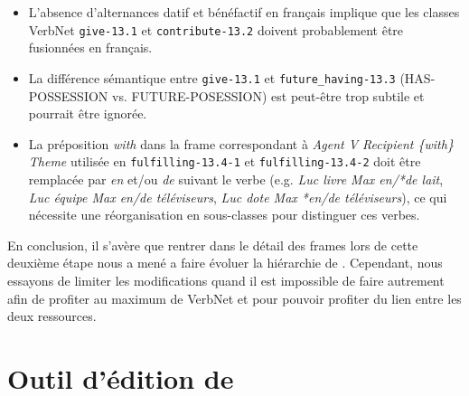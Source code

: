 \begin{itemize}
    \item L'absence d'alternances datif et bénéfactif en français implique que
        les classes VerbNet {\color{blue}\texttt{give-13.1}} et
        {\color{blue}\texttt{contribute-13.2}} doivent probablement être fusionnées en
        français.
    \item La différence sémantique entre {\color{blue}\texttt{give-13.1}} et
        {\color{blue}\texttt{future\_having-13.3}} (HAS-POSSESSION vs. FUTURE-POSESSION)
        est peut-être trop subtile et pourrait être ignorée.
    \item La préposition \textit{with} dans la frame correspondant à \textit{Agent
        V Recipient \{with\} Theme} utilisée en
        {\color{blue}\texttt{fulfilling-13.4-1}} et
        {\color{blue}\texttt{fulfilling-13.4-2}} doit être remplacée par
        \textit{en} et/ou \textit{de} suivant le verbe (e.g. \textit{Luc livre Max
        en/*de lait}, \textit{Luc équipe Max en/de téléviseurs}, \textit{Luc dote
        Max *en/de téléviseurs}), ce qui nécessite une réorganisation en
        sous-classes pour distinguer ces verbes.
\end{itemize}

En conclusion, il s'avère que rentrer dans le détail des frames lors de cette
deuxième étape nous a mené a faire évoluer la hiérarchie de \verbenet{}.
Cependant, nous essayons de limiter les modifications quand il est impossible
de faire autrement afin de profiter au maximum de VerbNet et pour pouvoir
profiter du lien entre les deux ressources.

\section{Outil d'édition de \verbenet{}}\label{toolquentin}

